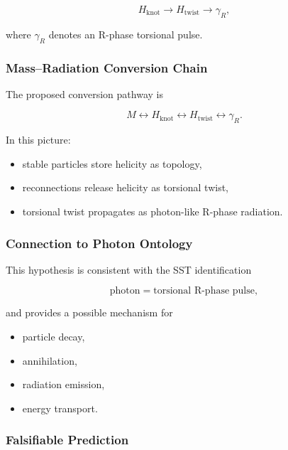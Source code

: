         \[
            H_{\mathrm{knot}}
            \rightarrow
            H_{\mathrm{twist}}
            \rightarrow
            \gamma_R ,
        \]
        
        where $\gamma_R$ denotes an R-phase torsional pulse.
    
    \subsubsection{Mass--Radiation Conversion Chain}
        
        The proposed conversion pathway is
        
        \[
            M
            \leftrightarrow
            H_{\mathrm{knot}}
            \leftrightarrow
            H_{\mathrm{twist}}
            \leftrightarrow
            \gamma_R.
        \]
        
        In this picture:
        
        \begin{itemize}
            \item stable particles store helicity as topology,
            \item reconnections release helicity as torsional twist,
            \item torsional twist propagates as photon-like R-phase radiation.
        \end{itemize}
    
    \subsubsection{Connection to Photon Ontology}
        
        This hypothesis is consistent with the SST identification
        
        \[
            \text{photon}
            =
            \text{torsional R-phase pulse},
        \]
        
        and provides a possible mechanism for
        
        \begin{itemize}
            \item particle decay,
            \item annihilation,
            \item radiation emission,
            \item energy transport.
        \end{itemize}
    
    \subsubsection{Falsifiable Prediction}
        
